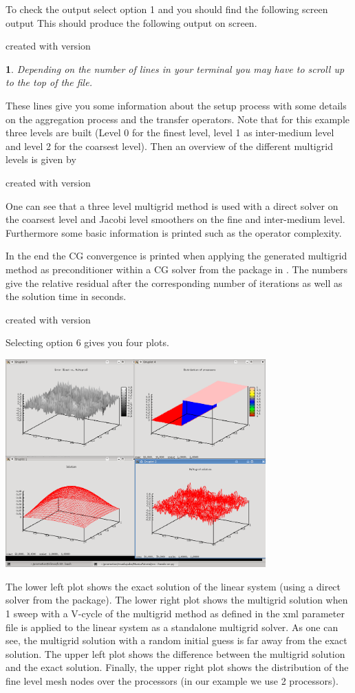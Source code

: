 \documentclass[10pt,fleqn]{book}
\newtheorem*{mycomment}{\ding{42}}
\newcommand\printScreenOutput[1]{

{\vspace{-0.3cm}\hfill\tiny{created with \muelu version }}
}
\begin{document}
To check the output select option 1 and you should find the following screen output
This should produce the following output on screen.

\printScreenOutput{s1_easy.txt_3.fragment_1.fragment}

\begin{mycomment}
Depending on the number of lines in your terminal you may have to scroll up to the top of the file.
\end{mycomment}

These lines give you some information about the setup process with some details on the aggregation process and the transfer operators. Note that for this example three levels are built (Level 0 for the finest level, level 1 as inter-medium level and level 2 for the coarsest level). Then an overview of the different multigrid levels is given by

\printScreenOutput{s1_easy.txt_3.fragment_3.fragment}

One can see that a three level multigrid method is used with a direct solver on the coarsest level and Jacobi level smoothers on the fine and inter-medium level. Furthermore some basic information is printed such as the operator complexity.

In the end the CG convergence is printed when applying the generated multigrid method as preconditioner within a CG solver from the \aztecoo package in \trilinos.
The numbers give the relative residual after the corresponding number of iterations as well as the solution time in seconds.
\printScreenOutput{s1_easy.txt_5.fragment}

Selecting option 6 gives you four plots.
\begin{center}\includegraphics[width=10cm]{pics/tut1_6.png} \end{center}
The lower left plot shows the exact solution of the linear system (using a direct solver from the \amesos package). The lower right plot shows the multigrid solution when 1 sweep with a V-cycle of the multigrid method as defined in the xml parameter file is applied to the linear system as a standalone multigrid solver. As one can see, the multigrid solution with a random initial guess is far away from the exact solution. The upper left plot shows the difference between the multigrid solution and the exact solution. Finally, the upper right plot shows the distribution of the fine level mesh nodes over the processors (in our example we use 2 processors).
\end{document}
